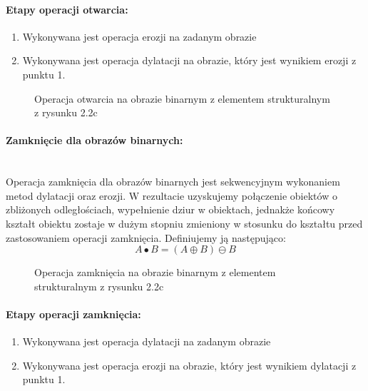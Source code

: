 \documentclass[a4paper,12pt,twoside,openany]{report}
\newcommand{\ImgPath}{.}
\begin{document}
\paragraph{Etapy operacji otwarcia:}
\begin{enumerate}
	\item Wykonywana jest operacja erozji na zadanym obrazie
	\item Wykonywana jest operacja dylatacji na obrazie, który jest wynikiem erozji z punktu 1.
\end{enumerate}

\begin{figure}[H]
	\centering
	\caption{Operacja otwarcia na obrazie binarnym z elementem strukturalnym z rysunku 2.2c}
\end{figure}

\paragraph{Zamknięcie dla obrazów binarnych:}\mbox{} \\
\indent Operacja zamknięcia dla obrazów binarnych jest sekwencyjnym wykonaniem metod dylatacji oraz erozji. W rezultacie uzyskujemy połączenie obiektów o zbliżonych odległościach, wypełnienie dziur w obiektach, jednakże końcowy kształt obiektu zostaje w dużym stopniu zmieniony w stosunku do kształtu przed zastosowaniem operacji zamknięcia. Definiujemy ją następująco:
\begin{equation}
	 A \bullet B = (A \oplus B) \ominus B  
\end{equation}

\begin{figure}[H]
	\centering
	\caption{Operacja zamknięcia na obrazie binarnym z elementem strukturalnym z rysunku 2.2c}
\end{figure}

\paragraph{Etapy operacji zamknięcia:}
\begin{enumerate}
	\item Wykonywana jest operacja dylatacji na zadanym obrazie
	\item Wykonywana jest operacja erozji na obrazie, który jest wynikiem dylatacji z punktu 1.
\end{enumerate}
\end{document}
